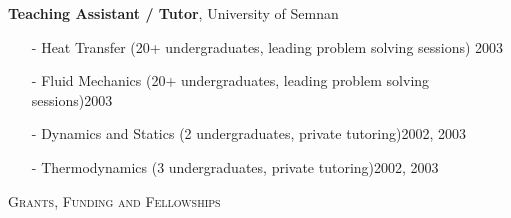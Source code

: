 \documentclass[10pt]{article}
\newenvironment{changemargin}[2]{%
  \begin{list}{}{%
    \setlength{\topsep}{0pt}%
    \setlength{\leftmargin}{#1}%
    \setlength{\rightmargin}{#2}%
    \setlength{\listparindent}{\parindent}%
    \setlength{\itemindent}{\parindent}%
    \setlength{\parsep}{\parskip}%
  }%
  \item[]}{\end{list}
}
\newcommand{\lineover}{
	\begin{changemargin}{-0.05in}{-0.05in}
		\vspace*{-8pt}
		\hrulefill \\
		\vspace*{-2pt}
	\end{changemargin}
}
\newcommand{\header}[1]{
	\begin{changemargin}{-0.5in}{-0.5in}
		\scshape{#1}\\
  	\lineover
	\end{changemargin}
}
\newenvironment{body} {
	\vspace*{-2pt}
	\begin{changemargin}{-0.5in}{-0.5in}
  }
	{\end{changemargin}
}
\begin{document}
\begin{body}
	\textbf {Teaching Assistant / Tutor}, University of Semnan \\
		\vspace*{-4pt}
		\begin{itemize} \itemsep -0pt
        \item[-]Heat Transfer  (20+ undergraduates,  leading problem solving sessions) \hfill {2003}
        \item[-]Fluid Mechanics  (20+ undergraduates,  leading problem solving sessions)\hfill {2003}
        \item[-]Dynamics and Statics (2 undergraduates, private tutoring)\hfill {2002, 2003}
        \item[-]Thermodynamics  (3 undergraduates, private tutoring)\hfill {2002, 2003}
    	\end{itemize}
\medskip

\end{body}
\medskip

\header{Grants, Funding and Fellowships}
\end{document}

